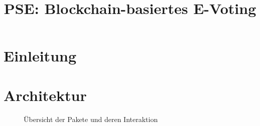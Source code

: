 \documentclass[parskip=full]{scrartcl}
\title{PSE: Blockchain-basiertes E-Voting}
\begin{document}
	\clearpage
	\maketitle
	\newpage
	
	\tableofcontents
	\newpage
	\section{Einleitung}
	
	\section{Architektur}
	\begin{figure}[!h]
	\centering
	
	\caption{Übersicht der Pakete und deren Interaktion}
	\end{figure}
\end{document}
